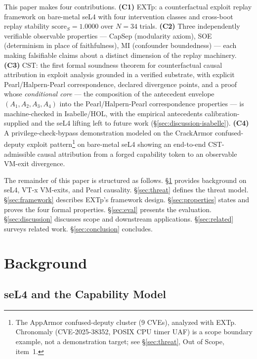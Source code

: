 \documentclass[conference]{IEEEtran}
\newcommand{\scoreS}{\text{score}_S}
\begin{document}
This paper makes four contributions.
\textbf{(C1)} EXTp: a counterfactual exploit replay framework on
bare-metal seL4 with four intervention classes and cross-boot replay
stability $\scoreS = 1.0000$ over $N{=}34$ trials.
\textbf{(C2)} Three independently verifiable observable properties
--- CapSep (modularity axiom), SOE (determinism in place of faithfulness), MI
(confounder boundedness) --- each making falsifiable claims about a
distinct dimension of the replay machinery.
\textbf{(C3)} CST: the first formal soundness theorem for
counterfactual causal attribution in exploit analysis grounded in a
verified substrate, with explicit
Pearl/Halpern-Pearl correspondence, declared divergence points, and a
proof whose \emph{conditional core} --- the composition of the
antecedent envelope $(A_1, A_2, A_3, A_4)$ into the Pearl/Halpern-Pearl
correspondence properties --- is machine-checked in Isabelle/HOL, with
the empirical antecedents calibration-supplied and the seL4 lifting
left to future work (\S\ref{sec:discussion-isabelle}).
\textbf{(C4)} A privilege-check-bypass demonstration modeled on the
CrackArmor confused-deputy exploit pattern\footnote{The AppArmor
confused-deputy cluster (9 CVEs), analyzed with EXTp. Chronomaly
(CVE-2025-38352, POSIX CPU timer UAF) is a scope boundary example,
not a demonstration target; see \S\ref{sec:threat}, Out of Scope,
item~1.} on bare-metal seL4 showing an end-to-end
CST-admissible causal attribution from a forged capability token to
an observable VM-exit divergence.

The remainder of this paper is structured as follows. \S\ref{sec:background}
provides background on seL4, VT-x VM-exits, and Pearl causality.
\S\ref{sec:threat} defines the threat model. \S\ref{sec:framework}
describes EXTp's framework design. \S\ref{sec:properties} states and
proves the four formal properties. \S\ref{sec:eval} presents the
evaluation. \S\ref{sec:discussion} discusses scope and downstream
applications. \S\ref{sec:related} surveys related work.
\S\ref{sec:conclusion} concludes.

\section{Background}\label{sec:background}

\subsection{seL4 and the Capability Model}
\end{document}
